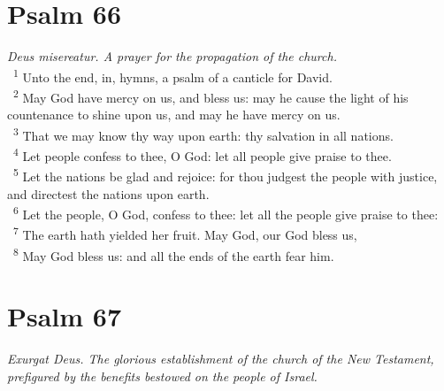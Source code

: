 \documentclass[a5paper,12pt]{article}
\begin{document}
\begin{multicols*}{2}
\section{Psalm 66}
\label{sec:org8c0b9f0}
\emph{Deus misereatur. A prayer for the propagation of the church.}\\

~\textsuperscript{1} Unto the end, in, hymns, a psalm of a canticle for David.\\
~\textsuperscript{2} May God have mercy on us, and bless us: may he cause the light of his countenance to shine upon us, and may he have mercy on us.\\
~\textsuperscript{3} That we may know thy way upon earth: thy salvation in all nations.\\
~\textsuperscript{4} Let people confess to thee, O God: let all people give praise to thee.\\
~\textsuperscript{5} Let the nations be glad and rejoice: for thou judgest the people with justice, and directest the nations upon earth.\\
~\textsuperscript{6} Let the people, O God, confess to thee: let all the people give praise to thee:\\
~\textsuperscript{7} The earth hath yielded her fruit. May God, our God bless us,\\
~\textsuperscript{8} May God bless us: and all the ends of the earth fear him.\\

\section{Psalm 67}
\label{sec:orge096bc1}
\emph{Exurgat Deus. The glorious establishment of the church of the New Testament, prefigured by the benefits bestowed on the people of Israel.}\\


\end{multicols*}
\end{document}

